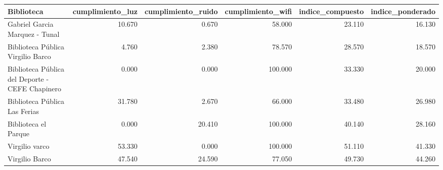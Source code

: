 \begin{tabular}{lrrrrr}
\toprule
Biblioteca & cumplimiento\_luz & cumplimiento\_ruido & cumplimiento\_wifi & indice\_compuesto & indice\_ponderado \\
\midrule
Gabriel Garcia Marquez - Tunal & 10.670 & 0.670 & 58.000 & 23.110 & 16.130 \\
Biblioteca Pública Virgilio Barco & 4.760 & 2.380 & 78.570 & 28.570 & 18.570 \\
Biblioteca Pública del Deporte - CEFE Chapinero & 0.000 & 0.000 & 100.000 & 33.330 & 20.000 \\
Biblioteca Pública Las Ferias & 31.780 & 2.670 & 66.000 & 33.480 & 26.980 \\
Biblioteca el Parque & 0.000 & 20.410 & 100.000 & 40.140 & 28.160 \\
Virgilio varco & 53.330 & 0.000 & 100.000 & 51.110 & 41.330 \\
Virgilio Barco & 47.540 & 24.590 & 77.050 & 49.730 & 44.260 \\
\bottomrule
\end{tabular}
